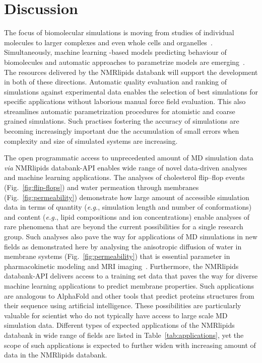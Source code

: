 \documentclass[fleqn,10pt]{wlscirep}
\begin{document}
\section{Discussion}


The focus of biomolecular simulations is moving from studies of individual molecules to larger complexes and even whole cells and organelles~\cite{johnson15,thornburg22,gupta22}. Simultaneously, machine learning -based models predicting behaviour of biomolecules and automatic approaches to parametrize models are emerging~\cite{jumper21,antila22b}. The resources delivered by the NMRlipids databank will support the development in both of these directions. Automatic quality evaluation and ranking of simulations against experimental data enables the selection of best simulations for specific applications without laborious manual force field evaluation. This also streamlines automatic parametrization procedures for atomistic and coarse grained simulations. Such practises fostering the accuracy of simulations are becoming increasingly important due the accumulation of small errors when complexity and size of simulated systems are increasing.

The open programmatic access to unprecedented amount of MD simulation data \textit{via} NMRlipids databank-API enables wide range of novel data-driven analyses and machine learning applications. The analyses of cholesterol flip--flop events (Fig.~\ref{fig:flip-flops}) and water permeation through membranes (Fig.~\ref{fig:permeability}) demonstrate how large amount of accessible simulation data in terms of quantity (\textit{e.g.}, simulation length and number of conformations) and content (\textit{e.g.}, lipid compositions and ion concentrations) enable analyses of rare phenomena that are beyond the current possibilities for a single research group. Such analyses also pave the way for applications of MD simulations in new fields as demonstrated here by analysing the anisotropic diffusion of water in membrane systems (Fig.~\ref{fig:permeability}) that is essential parameter in pharmacokinetic modeling and MRI imaging~\cite{nitsche19,topgaard20}. Furthermore, the NMRlipids databank-API delivers access to a training set data that paves the way for diverse machine learning applications to 
predict membrane properties. Such applications are analogous to AlphaFold \cite{jumper21} and other tools that predict proteins structures from their sequence using artificial intelligence. These possibilities are particularly valuable for scientist who do not typically have access to large scale MD simulation data. Different types of expected applications of the NMRlipids databank in wide range of fields are listed in Table~\ref{tab:applications}, yet the scope of such applications
is expected to further widen with increasing amount of data in the NMRlipids databank.  
\end{document}
